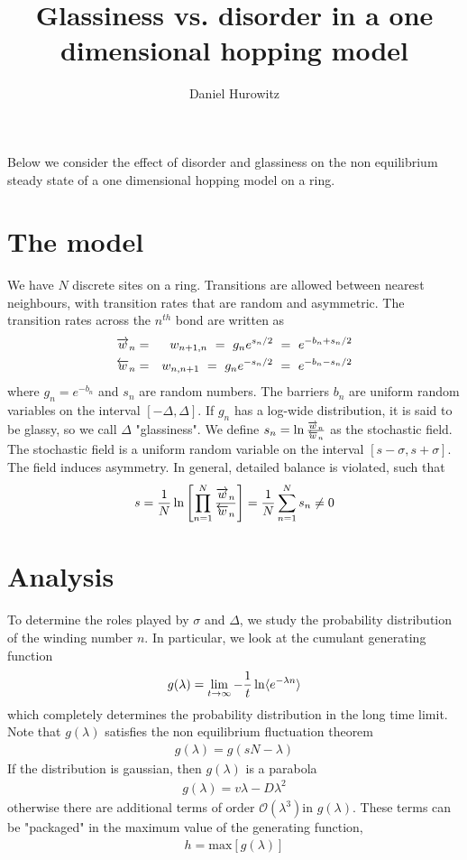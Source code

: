 \documentclass[aps,pre,floats,floatfix,fleqn]{revtex4}
\newcommand{\mylabel}[1]{\label{#1}}  %
\newcommand{\beq}{\begin{eqnarray}}
\newcommand{\eeq}{\end{eqnarray}}
\newcommand{\be}[1]{\begin{eqnarray}\ifthenelse{#1=-1}{\nonumber}{\ifthenelse{#1=0}{}{\mylabel{e#1}}}}
\newcommand{\ee}{\end{eqnarray}}
\newcommand{\ola}{\protect\overleftarrow}
\newcommand{\ora}{\protect\overrightarrow}
\begin{document}
\title{Glassiness vs. disorder in a one dimensional hopping model}

\author{Daniel Hurowitz}

\maketitle

Below we consider the effect of disorder and glassiness 
on the non equilibrium steady state of a one dimensional hopping model on a ring.
\section{The model}
We have $N$ discrete sites on a ring. 
Transitions are allowed between nearest neighbours, 
with  transition rates that are random and asymmetric. 
The transition rates across the $n^{th}$ bond are written as 
%
\be{1}
\ora{w}_{n} &=&  w_{n+1,n} \ = \ g_n e^{s_n/2} \ = \ e^{-b_n +s_n/2 }\\
\ola{w}_{n} &=&  w_{n,n+1} \ = \ g_n e^{-s_n/2} \ = \ e^{-b_n -s_n/2 }
\ee
%
where $g_n=e^{-b_n}$ and $s_n$ are random numbers. The barriers $b_n$ are uniform random 
variables on the interval $[-\Delta, \Delta]$.
%
If $g_n$ has a log-wide distribution, it is said to be glassy, so we call $\Delta$ "glassiness". 
%
We define $s_n = \ln \frac{\ora{w}_{n}}{\ola{w}_{n}}$  as the stochastic field. 
The stochastic field is a uniform random variable on the interval $[s-\sigma, s+\sigma]$. The field induces asymmetry.
%
In general, detailed balance is violated, such that 
%
\be{2}
s = \frac{1}{N} \ln \left[ \prod_{n=1}^N \frac{\ora{w}_n}{\ola{w}_n} \right]= \frac{1}{N} \sum_{n=1}^N s_n \neq 0
\ee
%

\section{Analysis}
To determine the roles played by $\sigma$ and $\Delta$, we study 
the probability distribution of the winding number $n$.  
In particular, we look at the cumulant generating function
%
\be{3}
g(\lambda) = \lim_{t\to \infty} -\frac{1}{t} \ln  \langle e^{-\lambda n} \rangle
\ee
%
which completely determines the probability distribution in the long time limit. 
Note that $g(\lambda)$ satisfies the non equilibrium fluctuation theorem 
%
\beq
g(\lambda) = g(sN-\lambda)
\eeq
%
If the distribution is gaussian, then $g(\lambda)$ is a parabola
%
\beq
g(\lambda) = v \lambda -D\lambda^2
\eeq
%
otherwise there are additional terms of order $\mathcal{O}(\lambda^3)$in $g(\lambda)$.
These terms can be "packaged" in the maximum value of the generating function, 
%
\beq
h=\text{max}[g(\lambda)]
\eeq
\end{document}
